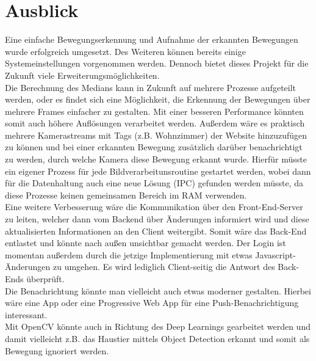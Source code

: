 \chapter{Ausblick}
Eine einfache Bewegungserkennung und Aufnahme der erkannten Bewegungen wurde erfolgreich umgesetzt. Des Weiteren können bereits einige Systemeinstellungen vorgenommen werden. Dennoch bietet dieses Projekt für die Zukunft viele Erweiterungsmöglichkeiten.\\
Die Berechnung des Medians kann in Zukunft auf mehrere Prozesse aufgeteilt werden, oder es findet sich eine Möglichkeit, die Erkennung der Bewegungen über mehrere Frames einfacher zu gestalten.
Mit einer besseren Performance könnten somit auch höhere Auflösungen verarbeitet werden.
Außerdem wäre es praktisch mehrere Kamerastreams mit Tags (z.B. Wohnzimmer) der Website hinzuzufügen zu können und bei einer erkannten Bewegung zusätzlich darüber benachrichtigt zu werden, durch welche Kamera diese Bewegung erkannt wurde. Hierfür müsste ein eigener Prozess für jede Bildverarbeitunsroutine gestartet werden, wobei dann für die Datenhaltung auch eine neue Lösung (IPC) gefunden werden müsste, da diese Prozesse keinen gemeinsamen Bereich im RAM verwenden.\\
Eine weitere Verbesserung wäre die Kommunikation über den Front-End-Server zu leiten, welcher dann vom Backend über Änderungen informiert wird und diese aktualisierten Informationen an den Client weitergibt. Somit wäre das Back-End entlastet und könnte nach außen unsichtbar gemacht werden. Der Login ist momentan außerdem durch die jetzige Implementierung mit etwas Javascript-Änderungen zu umgehen. Es wird lediglich Client-seitig die Antwort des Back-Ends überprüft.\\
Die Benachrichtung könnte man vielleicht auch etwas moderner gestalten. Hierbei wäre eine App oder eine Progressive Web App für eine Push-Benachrichtigung interessant.\\
Mit OpenCV könnte auch in Richtung des Deep Learnings gearbeitet werden und damit vielleicht z.B. das Haustier mittels Object Detection erkannt und somit als Bewegung ignoriert werden.